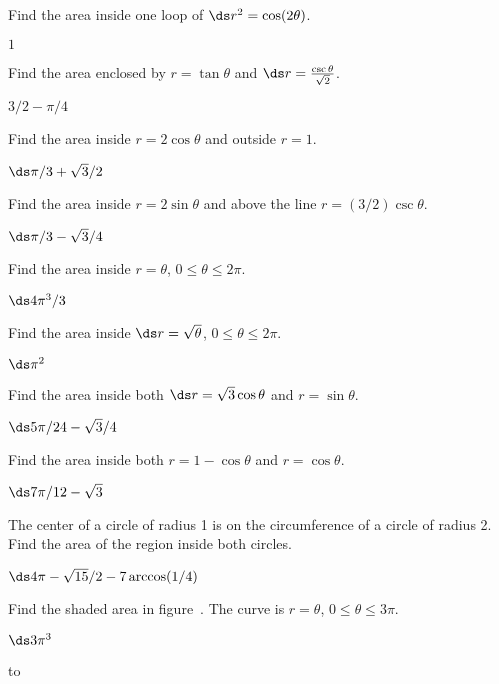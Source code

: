 \begin{exercises}
\exercise Find the area inside one loop of $\ds r^2=\cos(2\theta)$.
\begin{answer} $1$
\end{answer}

\exercise Find the area enclosed by $r=\tan\theta$ and 
$\ds r={\csc\theta\over\sqrt2}$.
\begin{answer} $3/2-\pi/4$
\end{answer}

\exercise Find the area inside $r=2\cos\theta$ and outside
$r=1$.
\begin{answer} $\ds \pi/3+\sqrt3/2$
\end{answer}

\exercise Find the area inside $r=2\sin\theta$ and above
the line $r=(3/2)\csc\theta$.
\begin{answer} $\ds \pi/3-\sqrt3/4$
\end{answer}

\exercise Find the area inside $r=\theta$, $0\le\theta\le2\pi$.
\begin{answer} $\ds 4\pi^3/3$
\end{answer}

\exercise Find the area inside $\ds r=\sqrt{\theta}$, $0\le\theta\le2\pi$.
\begin{answer} $\ds \pi^2$
\end{answer}

\exercise Find the area inside both $\ds r=\sqrt3\cos\theta$ and
$r=\sin\theta$.
\begin{answer} $\ds 5\pi/24-\sqrt3/4$
\end{answer}

\exercise Find the area inside both $r=1-\cos\theta$
and $r=\cos\theta$.
\begin{answer} $\ds 7\pi/12-\sqrt3$
\end{answer}

\exercise The center of a circle of radius 1 is on the 
circumference of a circle of radius 2. Find the area 
of the region inside both circles.
\begin{answer} $\ds 4\pi-\sqrt{15}/2-7\arccos(1/4)$
\end{answer}

\exercise Find the shaded area in figure~. 
The curve is $r=\theta$, $0\le\theta\le3\pi$.
\begin{answer} $\ds 3\pi^3$
\end{answer}

\figure
\hbox to 


\end{exercises}
